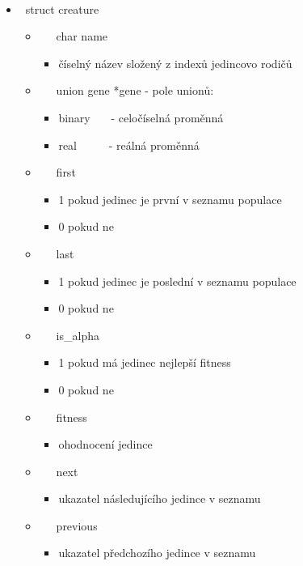 \documentclass{article}
\begin{document}
 \ \ \ 
\begin{itemize}
\item  \ struct creature
\begin{itemize}
\item  \ \ \ char name \ \ \ \ \ \ \ 
\begin{itemize}
\item číselný název složený z indexů jedincovo rodičů
\end{itemize}
\item  \ \ \ union gene *gene - pole unionů: 
\begin{itemize}
\item binary \ \ \ - celočíselná proměnná
\item real \ \ \ \ \ - reálná proměnná
\end{itemize}
\item  \ \ \ first \ \ \ \ \ \ 
\begin{itemize}
\item 1 pokud jedinec je první v seznamu populace
\item 0 pokud ne
\end{itemize}
\item  \ \ \ last \ \ \ \ \ \ \ 
\begin{itemize}
\item 1 pokud jedinec je poslední v seznamu populace
\item 0 pokud ne
\end{itemize}
\item  \ \ \ is\_alpha \ \ 
\begin{itemize}
\item 1 pokud má jedinec nejlepší fitness
\item 0 pokud ne
\end{itemize}
\item  \ \ \ fitness \ \ \ \ 
\begin{itemize}
\item ohodnocení jedince
\end{itemize}
\item  \ \ \ next \ \ \ \ \ \ \ 
\begin{itemize}
\item ukazatel následujícího jedince v seznamu
\end{itemize}
\item  \ \ \ previous \ \ \ 
\begin{itemize}
\item ukazatel předchozího jedince v seznamu
\end{itemize}
\end{itemize}
\end{itemize}
\end{document}
